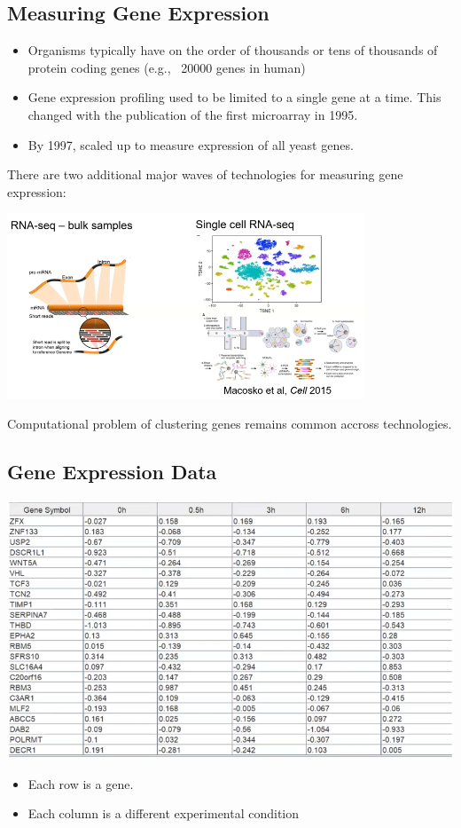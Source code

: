 \documentclass[10pt]{article}
\begin{document}
\subsection*{Measuring Gene Expression}
\begin{itemize}
    \item Organisms typically have on the order of thousands or tens of thousands of protein coding genes (e.g., ~20000 genes in human)
    \item Gene expression profiling used to be limited to a single gene at a time.  This changed with the publication of the first microarray in 1995.
    \item By 1997, scaled up to measure expression of all yeast genes.
\end{itemize}
There are two additional major waves of technologies for measuring gene expression:
\begin{center}
    \includegraphics[width=0.8\textwidth]{W6_2.png}
\end{center}
Computational problem of clustering genes remains common accross technologies.

\subsection*{Gene Expression Data}
\begin{center}
    \includegraphics[width=\textwidth]{W6_3.png}
\end{center}
\begin{itemize}
    \item Each row is a gene.
    \item Each column is a different experimental condition
\end{itemize}
\end{document}
